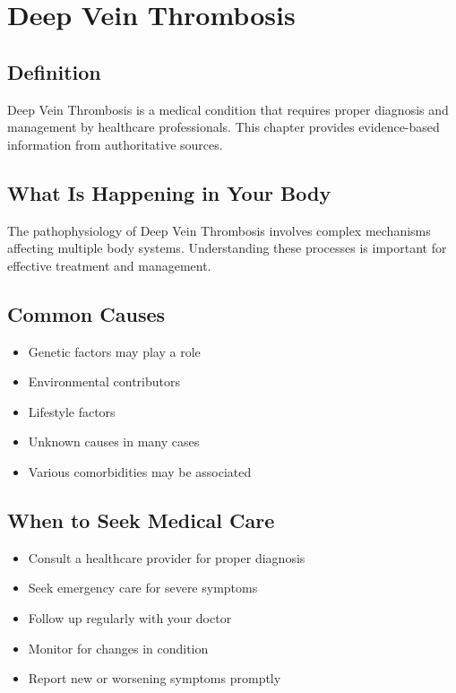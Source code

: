 
\chapter{Deep Vein Thrombosis}

\section*{Definition}
Deep Vein Thrombosis is a medical condition that requires proper diagnosis and management by healthcare professionals. This chapter provides evidence-based information from authoritative sources.

\section*{What Is Happening in Your Body}
The pathophysiology of Deep Vein Thrombosis involves complex mechanisms affecting multiple body systems. Understanding these processes is important for effective treatment and management.

\section*{Common Causes}
\begin{itemize}
  \item Genetic factors may play a role
  \item Environmental contributors
  \item Lifestyle factors
  \item Unknown causes in many cases
  \item Various comorbidities may be associated
\end{itemize}

\section*{When to Seek Medical Care}
\begin{itemize}
  \item Consult a healthcare provider for proper diagnosis
  \item Seek emergency care for severe symptoms
  \item Follow up regularly with your doctor
  \item Monitor for changes in condition
  \item Report new or worsening symptoms promptly
\end{itemize}

